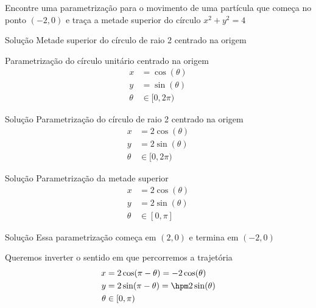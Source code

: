 \begin{question}
Encontre uma parametrização para o movimento de uma partícula que começa no
ponto \((-2, 0)\) e traça a metade superior do círculo \(x^2+y^2=4\)
\end{question}

\begin{resolution}{Solução}
  Metade superior do círculo de raio 2 centrado na origem

  Parametrização do círculo unitário centrado na origem
  \begin{align*}
    x      & = \cos(\theta) \\
    y      & = \sin(\theta) \\
    \theta & \in [0, 2\pi)
  \end{align*}
\end{resolution}

\begin{resolution}{Solução}
  Parametrização do círculo de raio 2 centrado na origem
  \begin{align*}
    x      & = 2\cos(\theta) \\
    y      & = 2\sin(\theta) \\
    \theta & \in [0, 2\pi)
  \end{align*}
\end{resolution}

\begin{resolution}{Solução}
  Parametrização da metade superior
  \begin{align*}
    x      & = 2\cos(\theta) \\
    y      & = 2\sin(\theta) \\
    \theta & \in [0, \pi]
  \end{align*}
\end{resolution}

\begin{resolution}{Solução}
  Essa parametrização começa em \((2, 0)\) e termina em \((-2, 0)\)


  Queremos inverter o sentido em que percorremos a trajetória
  \begin{align*}
    x      & = 2\cos(\pi -\theta) =    - 2 \cos(\theta)\\
    y      & = 2\sin(\pi -\theta) = \hpm 2 \sin(\theta)\\
    \theta & \in [0, \pi)
  \end{align*}
\end{resolution}

